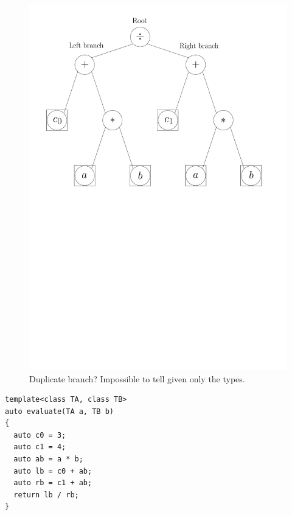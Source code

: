 \documentclass[a4paper,10pt]{article}
\begin{document}
\begin{minipage}{\linewidth}
  \centering
  \begin{minipage}{0.45\linewidth}
    \begin{figure}[H]
      \includegraphics[width=\linewidth]{fig_exprtree}
      \caption{Duplicate branch? Impossible to tell given only the types.}
      \label{fig:evaluate}
    \end{figure}
  \end{minipage}
  \hspace{0.05\linewidth}
  \begin{minipage}{0.45\linewidth}
\begin{lstlisting}[caption={\texttt{lb} and \texttt{rb} have the same type but do not represent the same expression.}, label=lst:evaluate]
template<class TA, class TB>
auto evaluate(TA a, TB b)
{
  auto c0 = 3;
  auto c1 = 4;
  auto ab = a * b;
  auto lb = c0 + ab;
  auto rb = c1 + ab;
  return lb / rb;
}
\end{lstlisting}
  \end{minipage}
\end{minipage}
\end{document}
